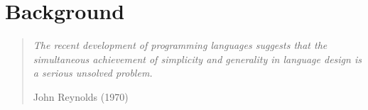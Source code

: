 \documentclass[12pt]{cmuthesis}
\begin{document}
\chapter{Background}\label{chap:background}
\vspace{-6px}
\begin{quote}\textit{The recent development of programming languages suggests that the simul\-taneous achievement of simplicity 
and generality in language design is a serious unsolved 
problem.}\begin{flushright}John Reynolds (1970) \cite{Reynolds70}\end{flushright}
\end{quote}
\vspace{-6px}
\end{document}
